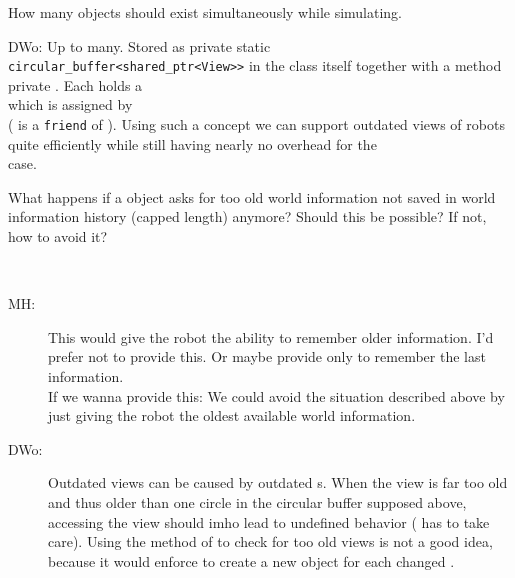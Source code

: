 \begin{appendix}
\begin{designQuestion}
	How many  objects should exist simultaneously while simulating. 
\end{designQuestion}
\begin{resolution}
	DWo: Up to  many. Stored as private static \\ \texttt{circular\_buffer<shared\_ptr<View>>} in the  class itself together with a method private . Each  holds a \\  which is assigned by \\ \newline ( is a \texttt{friend} of ). Using such a concept we can support outdated views of robots quite efficiently while still having nearly no overhead for the \\  case. 
\end{resolution}


\begin{designQuestion}
	What happens if a  object asks for too old world information not saved in world information history (capped length) anymore? Should this be possible? If not, how to avoid it?
\end{designQuestion}
\begin{resolution}~
\begin{description}
	\item [MH:] This would give the robot the ability to remember older information. I'd prefer not to provide this. Or maybe provide only to remember the last information.\\
	If we wanna provide this: We could avoid the situation described above by just giving the robot the oldest available world information.
	
	\item [DWo:] Outdated views can be caused by outdated s. When the view is far too old and thus older than one circle in the circular buffer supposed above, accessing the view should imho lead to undefined behavior ( has to take care). Using the  method of  to check for too old views is not a good idea, because it would enforce to create a new  object for each changed .
	

\end{description}
\end{resolution}
\end{appendix}
